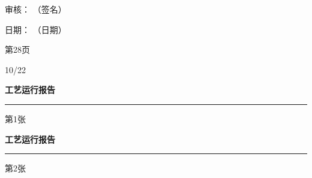 \documentclass[UTF8,10pt,a4paper,fontset=fandol]{ctexart}
\newcommand{\fieldvalue}[1]{#1}
\newcommand{\handwritten}[1]{#1}
\begin{document}
\begin{center}
\begin{minipage}[t]{0.47\textwidth}
\vspace{8pt}
审核：%
\fieldvalue{\handwritten{（签名）}}

\vspace{2pt}
日期：%
\fieldvalue{\handwritten{（日期）}}

\vspace{3pt}
第28页
\end{minipage}
\end{center}

\vfill

\handwritten{10/22}

\newpage

\begin{center}
\begin{minipage}[t]{0.47\textwidth}
\centering
\textbf{工艺运行报告}

\vspace{0.3em}
\noindent\rule{\linewidth}{0.4pt}

\vspace{0.6em}

\vspace{0.3em}
第1张
\end{minipage}
\hfill
\begin{minipage}[t]{0.47\textwidth}
\centering
\textbf{工艺运行报告}

\vspace{0.3em}
\noindent\rule{\linewidth}{0.4pt}

\vspace{0.6em}

\vspace{0.3em}
第2张
\end{minipage}
\end{center}

\vspace{1.5em}
\end{document}
